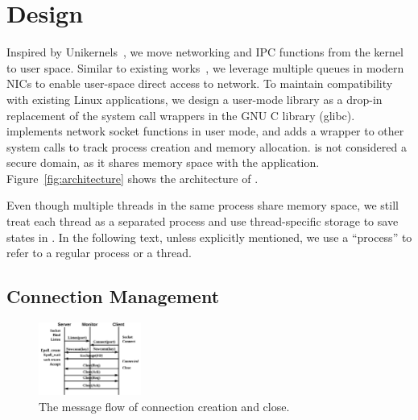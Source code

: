 \section{Design}
\label{sec:intra-server}

Inspired by Unikernels~\cite{madhavapeddy2013unikernels}, we move networking and IPC functions from the kernel to user space. Similar to existing works~\cite{peter2016arrakis,jeong2014mtcp,libvma}, we leverage multiple queues in modern NICs to enable user-space direct access to network. %
To maintain compatibility with existing Linux applications, we design a user-mode library \libipc as a drop-in replacement of the system call wrappers in the GNU C library (glibc). \libipc{} implements network socket functions in user mode, and adds a wrapper to other system calls to track process creation and memory allocation. \libipc{} is not considered a secure domain, as it shares memory space with the application. Figure~\ref{fig:architecture} shows the architecture of \sys{}.

Even though multiple threads in the same process share memory space, we still treat each thread as a separated process and use thread-specific storage to save states in \libipc. In the following text, unless explicitly mentioned, we use a ``process'' to refer to a regular process or a thread.

\subsection{Connection Management}
\label{subsec:socket-api}



\begin{figure}[t]
	\centering
	\includegraphics[width=0.3\textwidth]{images/conn-setup}
	\caption{The message flow of connection creation and close.}
	\label{fig:conn-setup}
	\vspace{-15pt}
\end{figure}

